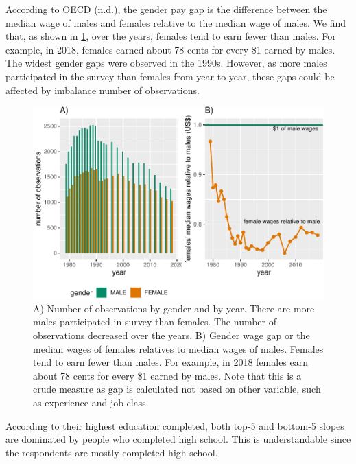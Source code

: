 \documentclass[12pt]{article}
\begin{document}
According to OECD (n.d.), the gender pay gap is the difference between the median wage of males and females relative to the median wage of males. We find that, as shown in \ref{fig:gap-gender}, over the years, females tend to earn fewer than males. For example, in 2018, females earned about 78 cents for every \$1 earned by males. The widest gender gaps were observed in the 1990s. However, as more males participated in the survey than females from year to year, these gaps could be affected by imbalance number of observations.

\begin{figure}

{\centering \includegraphics[width=0.9\linewidth]{figures/gap-gender-1} 

}

\caption{A) Number of observations by gender and by year. There are more males participated in survey than females. The number of observations decreased over the years. B) Gender wage gap or the median wages of females relatives to median wages of males. Females tend to earn fewer than males. For example, in 2018 females earn about 78 cents for every \$1 earned by males. Note that this is a crude measure as gap is calculated not based on other variable, such as experience and job class.}\label{fig:gap-gender}
\end{figure}

According to their highest education completed, both top-5 and bottom-5 slopes are dominated by people who completed high school. This is understandable since the respondents are mostly completed high school.
\end{document}
